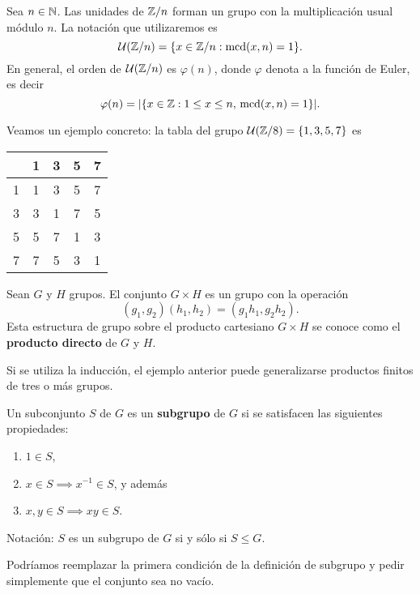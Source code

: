 \begin{example}
Sea $n\in\mathbb{N}$. Las unidades de $\mathbb{Z}/n$ forman un grupo con la multiplicación usual módulo $n$. La notación que utilizaremos es
\[	
\mathcal{U}(\mathbb{Z}/n)=\{x\in\mathbb{Z}/n:\operatorname{mcd}(x,n)=1\}.
\]
En general, el orden de $\mathcal{U}(\mathbb{Z}/n)$ es $\varphi(n)$, donde $\varphi$ denota a la función de Euler, es decir
\[
\varphi(n)=|\{x\in\mathbb{Z}:1\leq x\leq n,\,\operatorname{mcd}(x,n)=1\}|.
\]

Veamos un ejemplo concreto: la tabla del grupo 
$\mathcal{U}(\mathbb{Z}/8)=\{1,3,5,7\}$
es
\begin{center}
  \begin{tabular}{l|cccc}
     &1&3&5&7 \\
    \hline
    1 & 1 & 3 & 5 & 7\\
    3 & 3 & 1 & 7 & 5\\
    5 & 5 & 7 & 1 & 3\\
    7 & 7 & 5 & 3 & 1
  \end{tabular}
\end{center}
\end{example}

\begin{exercise}
	Sean $G$ y $H$ grupos.  
	El conjunto $G\times H$ 
	es un grupo con la operación
	\[
		(g_1,g_2)(h_1,h_2)=(g_1h_1,g_2h_2).
	\]
	Esta estructura de grupo sobre el producto cartesiano $G\times H$ se conoce como
	el \textbf{producto directo} de $G$ y $H$. 
\end{exercise}

Si se utiliza la inducción, el ejemplo anterior 
puede generalizarse productos finitos de tres o más grupos. 




\begin{definition}
	Un subconjunto $S$ de $G$ es un \textbf{subgrupo} de $G$ si se satisfacen
	las siguientes propiedades:
	\begin{enumerate}
		\item $1\in S$, 
		\item $x\in S\implies x^{-1}\in S$, y además 
		\item $x,y\in S\implies xy\in S$.
	\end{enumerate}
	Notación: $S$ es un subgrupo de $G$ si y sólo si $S\leq G$. 
\end{definition}

Podríamos reemplazar la primera condición de la definición de subgrupo y pedir
simplemente que el conjunto sea no vacío. 


